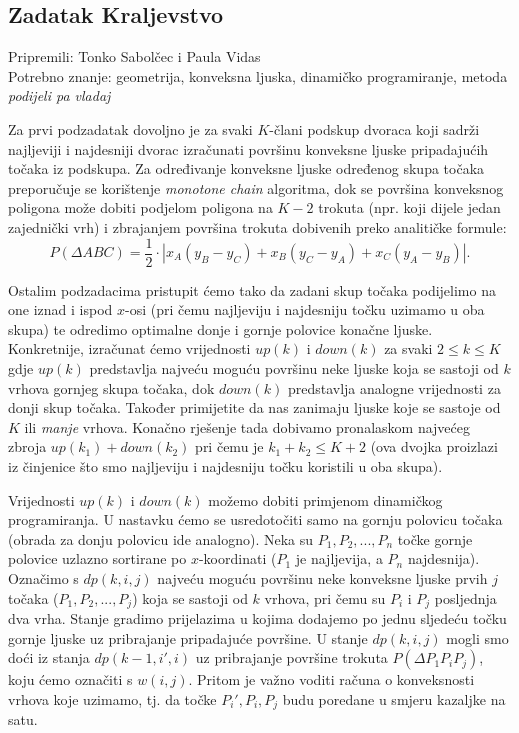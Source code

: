 \subsection*{Zadatak Kraljevstvo}
\textsf{Pripremili: Tonko Sabolčec i Paula Vidas}\\
\textsf{Potrebno znanje: geometrija, konveksna ljuska, dinamičko programiranje, metoda \textit{podijeli pa vladaj}}

Za prvi podzadatak dovoljno je za svaki $K$-člani podskup dvoraca koji sadrži
najljeviji i najdesniji dvorac izračunati površinu konveksne ljuske pripadajućih
točaka iz podskupa. Za određivanje konveksne ljuske određenog skupa točaka
preporučuje se korištenje \textit{monotone chain} algoritma, dok se površina
konveksnog poligona može dobiti podjelom poligona na $K - 2$ trokuta (npr.
koji dijele jedan zajednički vrh) i zbrajanjem površina trokuta dobivenih preko
analitičke formule:
\begin{equation*}
  P(\Delta ABC) = \frac{1}{2} \cdot |x_A(y_B - y_C) + x_B(y_C - y_A) + x_C(y_A - y_B)|.
\end{equation*}

Ostalim podzadacima pristupit ćemo tako da zadani skup točaka podijelimo na one
iznad i ispod $x$-osi (pri čemu najljeviju i najdesniju točku uzimamo u oba
skupa) te odredimo optimalne donje i gornje polovice konačne ljuske. Konkretnije,
izračunat ćemo vrijednosti $up(k)$ i $down(k)$ za svaki $2 \le k \le K$ gdje
$up(k)$ predstavlja najveću moguću površinu neke ljuske koja se sastoji od $k$
vrhova gornjeg skupa točaka, dok $down(k)$ predstavlja analogne vrijednosti za
donji skup točaka. Također primijetite da nas zanimaju ljuske koje se sastoje
od $K$ ili \textit{manje} vrhova. Konačno rješenje tada dobivamo pronalaskom najvećeg zbroja
$up(k_1) + down(k_2)$ pri čemu je $k_1 + k_2 \le K + 2$ (ova dvojka proizlazi iz
činjenice što smo najljeviju i najdesniju točku koristili u oba skupa).

Vrijednosti $up(k)$ i $down(k)$ možemo dobiti primjenom dinamičkog programiranja.
U nastavku ćemo se usredotočiti samo na gornju polovicu točaka (obrada za donju
polovicu ide analogno). Neka su $P_1, P_2, ..., P_n$ točke gornje polovice
uzlazno sortirane po $x$-koordinati ($P_1$ je najljevija, a $P_n$ najdesnija).
Označimo s $dp(k,i,j)$ najveću moguću površinu neke konveksne ljuske prvih
$j$ točaka ($P_1, P_2, ..., P_j$) koja se sastoji od $k$ vrhova, pri čemu su
$P_i$ i $P_j$ posljednja dva vrha. Stanje gradimo prijelazima u kojima dodajemo
po jednu sljedeću točku gornje ljuske uz pribrajanje pripadajuće površine.
U stanje $dp(k,i,j)$ mogli smo doći iz stanja $dp(k-1,i',i)$ uz pribrajanje
površine trokuta $P(\Delta P_1P_iP_j)$, koju ćemo označiti s $w(i, j)$.
Pritom je važno voditi računa o
konveksnosti vrhova koje uzimamo, tj. da točke $P_i', P_i, P_j$ budu poredane
u smjeru kazaljke na satu.

